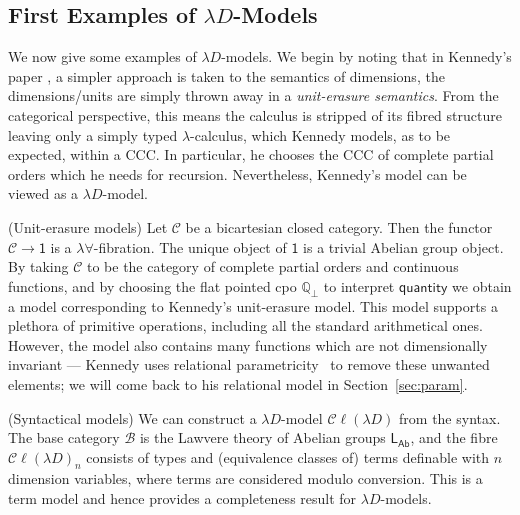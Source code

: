 \documentclass[a4paper,UKenglish]{lipics}
\newcommand{\ra}{\rightarrow}
\newcommand{\msf}[1]{\mathsf{#1}} %
\newcommand{\LAb}{\msf{L}_{\msf{Ab}}}
\newcommand{\terminal}{\msf{1}}
\newcommand{\ClLD}{\mathcal{C\ell}(\lambda{}D)} %
\newcommand{\B}{\mathcal{B}}
\newcommand{\C}{\mathcal{C}}
\newcommand{\bbQ}{\mathbb{Q}}
\newcommand{\qnt}{\msf{quantity}}
\begin{document}
\subsection{First Examples of $\lambda D$-Models}
We now give some examples of $\lambda D$-models. We begin by noting that in Kennedy's paper \cite{Kennedy:1997:RPU:263699.263761}, a simpler approach is taken to the semantics of dimensions, the dimensions/units are simply thrown away in a {\em unit-erasure semantics}. From the categorical perspective, this means the calculus is stripped of its fibred structure leaving only a simply typed $\lambda$-calculus, which Kennedy models, as to be expected, within a CCC. In particular, he chooses the CCC of complete partial orders which he needs for recursion. Nevertheless, Kennedy's model can be viewed as a $\lambda D$-model.


\begin{example}(Unit-erasure models)
\label{ex:UnitErasure}
Let $\C$ be a bicartesian closed category. Then the functor $\C \ra
\terminal$ is a $\lambda\forall$-fibration. The unique object of
$\terminal$ is a trivial Abelian group object. By taking $\C$ to be
the category of complete partial orders and continuous functions, and
by choosing the flat pointed cpo $\bbQ_{\bot}$ to interpret $\qnt$ we
obtain a model corresponding to Kennedy's unit-erasure model. This
model supports a plethora of primitive operations, including all the
standard arithmetical ones. However, the model also contains many
functions which are not dimensionally invariant --- Kennedy uses
relational parametricity~\cite{reynolds1983types} to remove these
unwanted elements; we will come back to his relational model in
Section~\ref{sec:param}.
\end{example}


\begin{example}(Syntactical models)
We can construct a $\lambda D$-model $\ClLD$ from the syntax. The base category $\B$ is the Lawvere theory of Abelian groups $\LAb$, and the fibre $\ClLD_n$ consists of types and (equivalence classes of) terms definable with $n$ dimension variables, where terms are considered modulo conversion. This is a term model and hence provides a completeness result for $\lambda D$-models.
\end{example}
\end{document}
